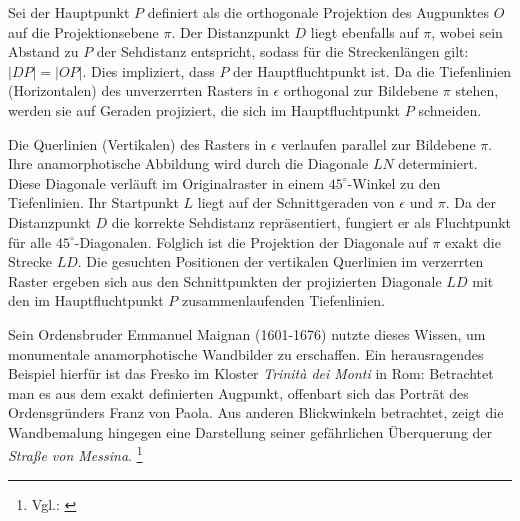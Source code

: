 Sei der Hauptpunkt $P$ definiert als die orthogonale Projektion des Augpunktes $O$ auf die Projektionsebene $\pi$. Der Distanzpunkt $D$ liegt ebenfalls auf $\pi$, wobei sein Abstand zu $P$ der Sehdistanz entspricht, sodass für die Streckenlängen gilt: $|DP| = |OP|$. Dies impliziert, dass $P$ der Hauptfluchtpunkt ist. Da die Tiefenlinien (Horizontalen) des unverzerrten Rasters in $\epsilon$ orthogonal zur Bildebene $\pi$ stehen, werden sie auf Geraden projiziert, die sich im Hauptfluchtpunkt $P$ schneiden.

Die Querlinien (Vertikalen) des Rasters in $\epsilon$ verlaufen parallel zur Bildebene $\pi$. Ihre anamorphotische Abbildung wird durch die Diagonale $LN$ determiniert. Diese Diagonale verläuft im Originalraster in einem $45^\circ$-Winkel zu den Tiefenlinien. Ihr Startpunkt $L$ liegt auf der Schnittgeraden von $\epsilon$ und $\pi$. Da der Distanzpunkt $D$ die korrekte Sehdistanz repräsentiert, fungiert er als Fluchtpunkt für alle $45^\circ$-Diagonalen. Folglich ist die Projektion der Diagonale auf $\pi$ exakt die Strecke $LD$. Die gesuchten Positionen der vertikalen Querlinien im verzerrten Raster ergeben sich aus den Schnittpunkten der projizierten Diagonale $LD$ mit den im Hauptfluchtpunkt $P$ zusammenlaufenden Tiefenlinien.

Sein Ordensbruder Emmanuel Maignan (1601-1676) nutzte dieses Wissen, um monumentale anamorphotische Wandbilder zu erschaffen. Ein herausragendes Beispiel hierfür ist das Fresko im Kloster \textit{Trinità dei Monti} in Rom: Betrachtet man es aus dem exakt definierten Augpunkt, offenbart sich das Porträt des Ordensgründers Franz von Paola. Aus anderen Blickwinkeln betrachtet, zeigt die Wandbemalung hingegen eine Darstellung seiner gefährlichen Überquerung der \textit{Straße von Messina}. \footnote{Vgl.: \cite[S. 455-457]{Andersen2007}}